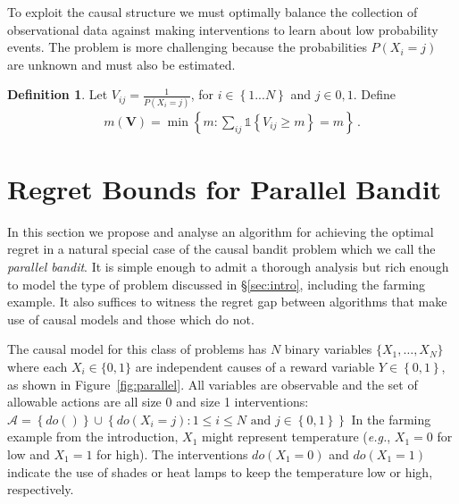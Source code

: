 \documentclass{article}
\newcommand{\set}[1]{\left\{#1\right\}}
\newcommand{\ind}[1]{\mathds{1}\!\!\set{#1}}
\newcommand{\eqn}[1]{\begin{align}#1\end{align}}
\newcommand{\eg}{\textit{e.g.}}
\theoremstyle{plain}
\theoremstyle{definition}
\newtheorem{definition}[theorem]{Definition}
\begin{document}
To exploit the causal structure we must optimally balance the collection of observational data against making interventions to learn about low probability events. The problem is more challenging because the probabilities $P(X_i=j)$ are unknown and must also be estimated.

\begin{definition}
Let $V_{ij} = \frac{1}{P(X_i = j)}$, for $i \in \set{1...N}$ and $j \in {0,1}$. 
Define 
\eqn{
\label{def:m}
m(\boldsymbol{V}) = \min \set{m: \sum_{ij} \ind{V_{ij} \geq m} = m}\,.
}
\end{definition}

\fi

\section{Regret Bounds for Parallel Bandit}
\label{sec:simple-regret}
In this section we propose and analyse an algorithm for achieving the optimal regret in a natural special 
case of the causal bandit problem which we call the {\it parallel bandit}.
It is simple enough to admit a thorough analysis but rich enough to model the type of problem discussed in \S\ref{sec:intro}, including the farming example. 
It also suffices to witness the regret gap between algorithms that make use of causal models and those which do not.

The causal model for this class of problems has $N$ binary variables $\{ X_1, \ldots, X_N \}$ where each $X_i \in \{0,1\}$ are independent causes of a 
reward variable $Y \in \set{0,1}$, as shown in Figure~\ref{fig:parallel}.
All variables are observable and the set of allowable actions are all size 0 and size 1 interventions: $\mathcal{A} = \set{do()} \cup \set{ do(X_i = j) \colon 1 \leq i \leq N \text{ and } j \in \set{0,1}}$
In the farming example from the introduction, $X_1$ might represent temperature (\eg, $X_1=0$ for low and $X_1=1$ for high). 
The interventions $do(X_1 = 0)$ and $do(X_1 = 1)$ indicate the use of shades or heat lamps to keep the temperature low or high, respectively.
\end{document}
